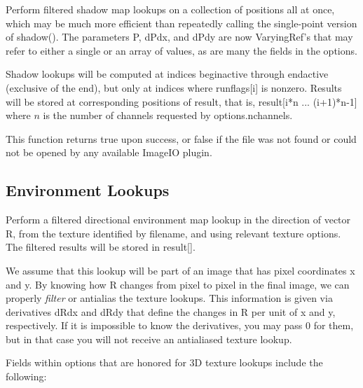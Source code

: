 Perform filtered shadow map lookups on a collection of positions all at
once, which may be much more efficient than repeatedly calling the
single-point version of {\cf shadow()}.  The parameters {\cf P},
{\cf dPdx}, and {\cf dPdy} are now
{\cf VaryingRef}'s that may refer to either a single or an array of
values, as are many the fields in the {\cf options}.

Shadow lookups will be computed at indices {\cf beginactive} through
{\cf endactive} (exclusive of the end), but only at indices where {\cf runflags[i]}
is nonzero.  Results will be stored at corresponding positions of
{\cf result}, that is, {\cf result[i*n ... (i+1)*n-1]} where $n$ 
is the number of channels requested by {\cf options.nchannels}.

This function returns {\cf true} upon success, or {\cf false} if the
file was not found or could not be opened by any available ImageIO
plugin.
\apiend

\subsection{Environment Lookups}
\label{sec:texturesys:api:environment}


Perform a filtered directional environment map lookup in the direction
of vector {\cf R}, from the texture identified by {\cf filename}, and
using relevant texture {\cf options}.  The filtered results will be
stored in {\cf result[]}.

We assume that this lookup will be part of an image that has pixel
coordinates {\cf x} and {\cf y}.  By knowing how {\cf R} changes from
pixel to pixel in the final image, we can properly \emph{filter} or
antialias the texture lookups.  This information is given via
derivatives {\cf dRdx} and {\cf dRdy} that define the changes in {\cf R}
per unit of {\cf x} and {\cf y}, respectively.  If it is impossible to
know the derivatives, you may pass 0 for them, but in that case you will
not receive an antialiased texture lookup.

Fields within {\cf options} that are honored for 3D texture lookups
include the following:

